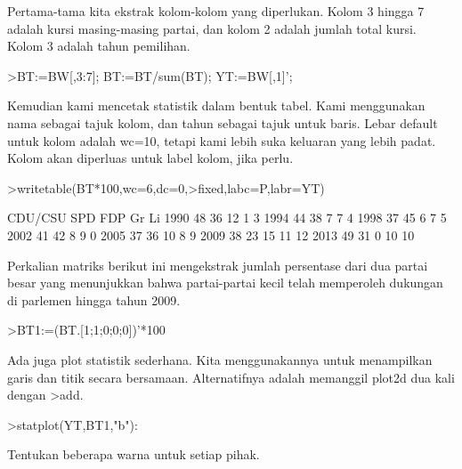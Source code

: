 \documentclass[a4paper,10pt]{article}
\begin{document}
\begin{eulernotebook}
\begin{eulercomment}
Pertama-tama kita ekstrak kolom-kolom yang diperlukan. Kolom 3 hingga
7 adalah kursi masing-masing partai, dan kolom 2 adalah jumlah total
kursi. Kolom 3 adalah tahun pemilihan.
\end{eulercomment}
\begin{eulerprompt}
>BT:=BW[,3:7]; BT:=BT/sum(BT); YT:=BW[,1]';
\end{eulerprompt}
\begin{eulercomment}
Kemudian kami mencetak statistik dalam bentuk tabel. Kami menggunakan
nama sebagai tajuk kolom, dan tahun sebagai tajuk untuk baris. Lebar
default untuk kolom adalah wc=10, tetapi kami lebih suka keluaran yang
lebih padat. Kolom akan diperluas untuk label kolom, jika perlu.
\end{eulercomment}
\begin{eulerprompt}
>writetable(BT*100,wc=6,dc=0,>fixed,labc=P,labr=YT)
\end{eulerprompt}
\begin{euleroutput}
         CDU/CSU   SPD   FDP    Gr    Li
    1990      48    36    12     1     3
    1994      44    38     7     7     4
    1998      37    45     6     7     5
    2002      41    42     8     9     0
    2005      37    36    10     8     9
    2009      38    23    15    11    12
    2013      49    31     0    10    10
\end{euleroutput}
\begin{eulercomment}
Perkalian matriks berikut ini mengekstrak jumlah persentase dari dua
partai besar yang menunjukkan bahwa partai-partai kecil telah
memperoleh dukungan di parlemen hingga tahun 2009.
\end{eulercomment}
\begin{eulerprompt}
>BT1:=(BT.[1;1;0;0;0])'*100
\end{eulerprompt}
\begin{euleroutput}
  [84.29,  81.25,  81.1659,  82.7529,  72.9642,  61.8971,  79.8732]
\end{euleroutput}
\begin{eulercomment}
Ada juga plot statistik sederhana. Kita menggunakannya untuk
menampilkan garis dan titik secara bersamaan. Alternatifnya adalah
memanggil plot2d dua kali dengan \textgreater{}add.
\end{eulercomment}
\begin{eulerprompt}
>statplot(YT,BT1,"b"):
\end{eulerprompt}
\begin{eulercomment}
Tentukan beberapa warna untuk setiap pihak.

\end{eulercomment}
\end{eulernotebook}
\end{document}

